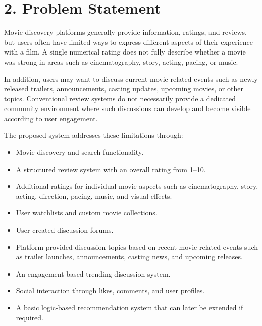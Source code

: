 \documentclass[11pt,a4paper]{article}
\begin{document}

\section{2. Problem Statement}

Movie discovery platforms generally provide information, ratings, and reviews, but users often have limited ways to express different aspects of their experience with a film. A single numerical rating does not fully describe whether a movie was strong in areas such as cinematography, story, acting, pacing, or music.

In addition, users may want to discuss current movie-related events such as newly released trailers, announcements, casting updates, upcoming movies, or other topics. Conventional review systems do not necessarily provide a dedicated community environment where such discussions can develop and become visible according to user engagement.

The proposed system addresses these limitations through:

\begin{itemize}

    \item Movie discovery and search functionality.

    \item A structured review system with an overall rating from 1--10.

    \item Additional ratings for individual movie aspects such as cinematography, story, acting, direction, pacing, music, and visual effects.

    \item User watchlists and custom movie collections.

    \item User-created discussion forums.

    \item Platform-provided discussion topics based on recent movie-related events such as trailer launches, announcements, casting news, and upcoming releases.

    \item An engagement-based trending discussion system.

    \item Social interaction through likes, comments, and user profiles.

    \item A basic logic-based recommendation system that can later be extended if required.

\end{itemize}
\end{document}
